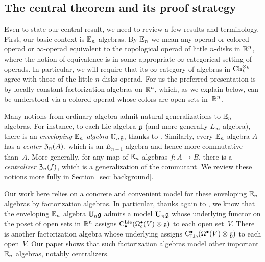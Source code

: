 \documentclass[11pt]{amsart}
\numberwithin{equation}{section}
\def\owen{\textcolor{magenta}{OG: }\textcolor{magenta}}
\begin{document}
\subsection{The central theorem and its proof strategy}


Even to state our central result, we need to review a few results and terminology.
First, our basic context is $\mathbb E_n$ algebras.
By $\mathbb E_n$ we mean any operad or colored operad or $\infty$-operad equivalent to the topological operad of little $n$-disks in $\mathbb R^n$, where the notion of equivalence is in some appropriate $\infty$-categorical setting of operads. 
In particular, we will require that its $\infty$-category of algebras in ${\rm Ch}_k^{\otimes_k}$ agree with those of the little $n$-disks operad. 
For us the preferred presentation is by locally constant factorization algebras on $\mathbb R^n$,
which, as we explain below, can be understood via a colored operad whose colors are open sets in~$\mathbb R^n$.

Many notions from ordinary algebra admit natural generalizations to $\mathbb E_n$ algebras.
For instance, to each Lie algebra $\mathfrak g$ (and more generally $L_\infty$ algebra),
there is an {\em enveloping $\mathbb E_n$ algebra} $\mathbb U_n \mathfrak g$, thanks to \cite{Knudsen}.
Similarly, every $\mathbb E_n$ algebra $A$ has a {\em center} ${\frak Z}_n(A)$, which is an $E_{n+1}$ algebra and hence more commutative than~$A$.
More generally, for any map of $\mathbb E_n$ algebras $f: A \to B$, there is a {\em centralizer} ${\frak Z}_n(f)$, 
which is a generalization of the commutant.
We review these notions more fully in Section~\ref{sec: background}.

Our work here relies on a concrete and convenient model for these enveloping $\mathbb E_n$ algebras by factorization algebras.
In particular, thanks again to \cite{Knudsen}, 
we know that the enveloping $\mathbb E_n$ algebra $\mathbb U_n \mathfrak g$ admits a model $\mathbf U_n \mathfrak g$ whose underlying functor on the poset of open sets in $\mathbb R^n$ assigns ${\rm C}^{\rm Lie}_\bullet(\Omega_c^\bullet(V) \otimes \mathfrak g)$ to each open set~$V$.
There is another factorization algebra whose underlying assigns ${\rm C}_{\rm Lie}^\bullet(\Omega^\bullet(V) \otimes \mathfrak g)$ to each open~$V$.
Our paper shows that such factorization algebras model other important $\mathbb E_n$ algebras, notably centralizers.
\end{document}
